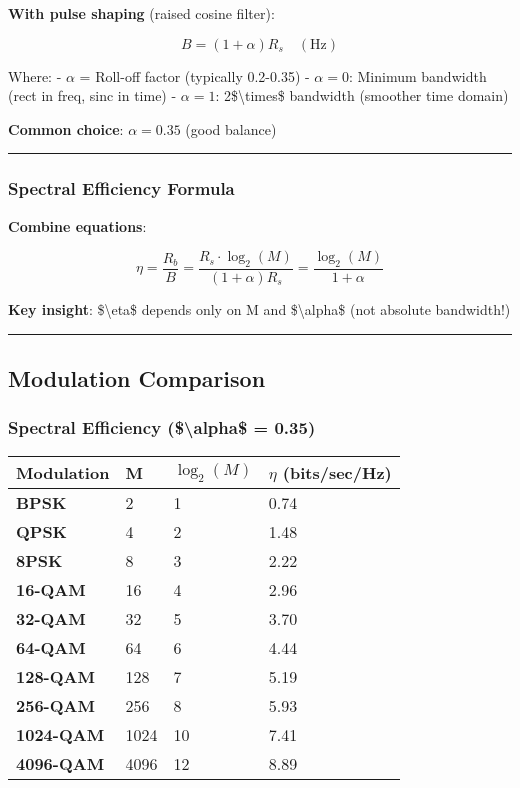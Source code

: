 \textbf{With pulse shaping} (raised cosine filter):

\[
B = (1 + \alpha) R_s \quad (\text{Hz})
\]

Where: - \(\alpha\) = Roll-off factor (typically 0.2-0.35) -
\(\alpha = 0\): Minimum bandwidth (rect in freq, sinc in time) -
\(\alpha = 1\): 2\$\textbackslash times\$ bandwidth (smoother time
domain)

\textbf{Common choice}: \(\alpha = 0.35\) (good balance)

\begin{center}\rule{0.5\linewidth}{0.5pt}\end{center}

\subsubsection{Spectral Efficiency
Formula}\label{spectral-efficiency-formula}

\textbf{Combine equations}:

\[
\eta = \frac{R_b}{B} = \frac{R_s \cdot \log_2(M)}{(1 + \alpha) R_s} = \frac{\log_2(M)}{1 + \alpha}
\]

\textbf{Key insight}: \$\textbackslash eta\$ depends only on M and
\$\textbackslash alpha\$ (not absolute bandwidth!)

\begin{center}\rule{0.5\linewidth}{0.5pt}\end{center}

\subsection{Modulation Comparison}\label{modulation-comparison}

\subsubsection{Spectral Efficiency (\$\textbackslash alpha\$ =
0.35)}\label{spectral-efficiency-ux3b1-0.35}

{\def\LTcaptype{} %
\begin{longtable}[]{@{}llll@{}}
\toprule\noalign{}
Modulation & M & \(\log_2(M)\) & \(\eta\) (bits/sec/Hz) \\
\midrule\noalign{}
\endhead
\bottomrule\noalign{}
\endlastfoot
\textbf{BPSK} & 2 & 1 & 0.74 \\
\textbf{QPSK} & 4 & 2 & 1.48 \\
\textbf{8PSK} & 8 & 3 & 2.22 \\
\textbf{16-QAM} & 16 & 4 & 2.96 \\
\textbf{32-QAM} & 32 & 5 & 3.70 \\
\textbf{64-QAM} & 64 & 6 & 4.44 \\
\textbf{128-QAM} & 128 & 7 & 5.19 \\
\textbf{256-QAM} & 256 & 8 & 5.93 \\
\textbf{1024-QAM} & 1024 & 10 & 7.41 \\
\textbf{4096-QAM} & 4096 & 12 & 8.89 \\
\end{longtable}
}

